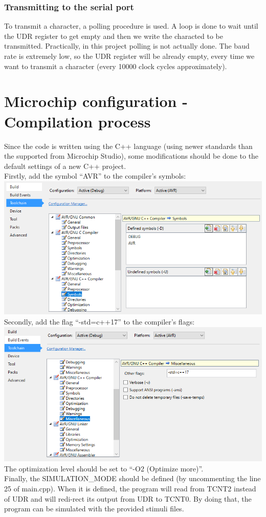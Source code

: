 \documentclass[12pt, a4, hidelinks]{article}
\begin{document}
\subsubsection*{Transmitting to the serial port}
To transmit a character, a polling procedure is used. A loop is done to wait until the UDR register to get empty and then we write the characted to be transmitted. Practically, in this project polling is not actually done. The baud rate is extremely low, so the UDR register will be already empty, every time we want to transmit a character (every 10000 clock cycles approximately).

\section*{Microchip configuration - Compilation process}
Since the code is written using the C++ language (using newer standards than the supported from Microchip Studio), some modifications should be done to the default settings of a new C++ project.  \\
Firstly, add the symbol “AVR” to the compiler’s symbols:\\
\includegraphics[scale=0.75]{CPP_AVR_SYMBOL.png} \\
Secondly, add the flag “-std=c++17” to the compiler’s flags:\\
\includegraphics[scale=0.75]{CPP_STD_17.png}  \\
The optimization level should be set to “-O2 (Optimize more)''.\\
Finally, the SIMULATION\_MODE should be defined (by uncommenting the line 25 of main.cpp). When it is defined, the program will read from TCNT2 instead of UDR and will redi-rect its output from UDR to TCNT0. By doing that, the program can be simulated with the provided stimuli files.
\end{document}
